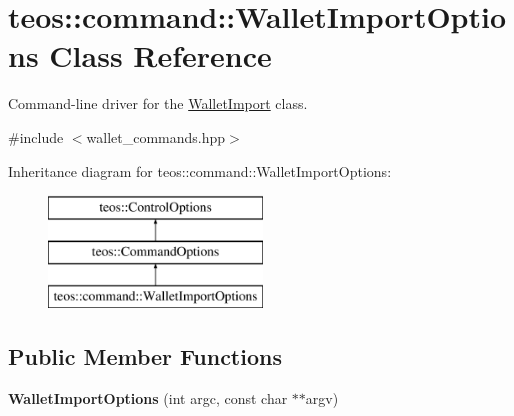 \hypertarget{classteos_1_1command_1_1_wallet_import_options}{}\section{teos\+:\+:command\+:\+:Wallet\+Import\+Options Class Reference}
\label{classteos_1_1command_1_1_wallet_import_options}


Command-\/line driver for the \mbox{\hyperlink{classteos_1_1command_1_1_wallet_import}{Wallet\+Import}} class.  




{\ttfamily \#include $<$wallet\+\_\+commands.\+hpp$>$}

Inheritance diagram for teos\+:\+:command\+:\+:Wallet\+Import\+Options\+:\begin{figure}[H]
\begin{center}
\leavevmode
\includegraphics[height=3.000000cm]{classteos_1_1command_1_1_wallet_import_options}
\end{center}
\end{figure}
\subsection*{Public Member Functions}
\begin{DoxyCompactItemize}
\item 
\mbox{\label{classteos_1_1command_1_1_wallet_import_options_a7149c93315a38b07515b96640f810ad0}} 
{\bfseries Wallet\+Import\+Options} (int argc, const char $\ast$$\ast$argv)
\end{DoxyCompactItemize}

